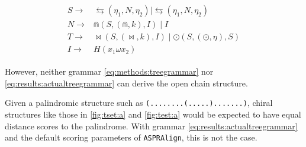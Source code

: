 \documentclass[../../master.tex]{subfiles}
\begin{document}
\begin{align}\label{eq:results:actualtreegrammar}
	\begin{split}
		S \rightarrow &\leftrightarrows(\eta_1, N, \eta_2) \mid \leftrightarrows(\eta_1, N, \eta_2) \\
		N \rightarrow &\Cap(S, (\Cap, k), I) \mid I \\
		T \rightarrow &\bowtie(S, (\bowtie, k), I) \mid \odot(S, (\odot, \eta), S) \\ 
		I \rightarrow & H (x_1 \omega x_2)
	\end{split}
\end{align}

However, neither grammar \eqref{eq:methods:treegrammar} nor \eqref{eq:results:actualtreegrammar} can derive the open chain structure.

Given a palindromic structure such as \texttt{(........(.....).......)}, chiral structures like those in \autoref{fig:tset:a} and \autoref{fig:test:a} would be expected to have equal distance scores to the palindrome. 
With grammar \eqref{eq:results:actualtreegrammar} and the default scoring parameters of \texttt{ASPRAlign}, this is not the case.
\end{document}
